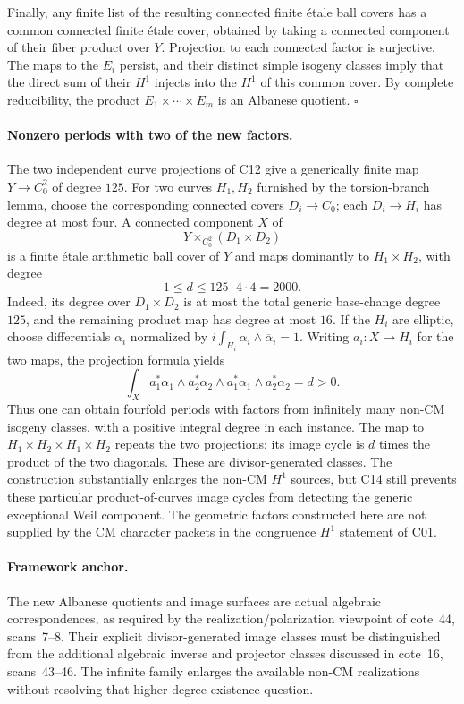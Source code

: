 Finally, any finite list of the resulting connected finite \'{e}tale
ball covers has a common connected finite \'{e}tale cover, obtained by
taking a connected component of their fiber product over $Y$.  Projection
to each connected factor is surjective.  The maps to the $E_i$ persist,
and their distinct simple isogeny classes imply that the direct sum of
their $H^1$ injects into the $H^1$ of this common cover.  By complete
reducibility, the product $E_1\times\cdots\times E_m$ is an Albanese
quotient. \hfill$\square$

\paragraph{Nonzero periods with two of the new factors.}
The two independent curve projections of C12 give a generically finite
map $Y\to C_0^2$ of degree $125$.  For two curves $H_1,H_2$ furnished by
the torsion-branch lemma, choose the corresponding connected covers
$D_i\to C_0$; each $D_i\to H_i$ has degree at most four.  A connected
component $X$ of
\[
 Y\times_{C_0^2}(D_1\times D_2)
\]
is a finite \'{e}tale arithmetic ball cover of $Y$ and maps dominantly to
$H_1\times H_2$, with degree
\[
 1\leq d\leq125\cdot4\cdot4=2000.
\]
Indeed, its degree over $D_1\times D_2$ is at most the total generic
base-change degree $125$, and the remaining product map has degree at
most $16$.  If the $H_i$ are elliptic, choose differentials $\alpha_i$
normalized by $i\int_{H_i}\alpha_i\wedge\overline\alpha_i=1$.
Writing $a_i:X\to H_i$ for the two maps, the projection formula yields
\[
 \int_X a_1^*\alpha_1\wedge a_2^*\alpha_2
       \wedge\overline{a_1^*\alpha_1}
       \wedge\overline{a_2^*\alpha_2}=d>0.
\]
Thus one can obtain fourfold periods with factors from infinitely many
non-CM isogeny classes, with a positive integral degree in each instance.
The map to $H_1\times H_2\times H_1\times H_2$ repeats the two
projections; its image cycle is $d$ times the product of the two diagonals.
These are divisor-generated classes.  The construction substantially
enlarges the non-CM $H^1$ sources, but C14 still prevents these particular
product-of-curves image cycles from detecting the generic exceptional
Weil component.  The geometric factors constructed here are not supplied
by the CM character packets in the congruence $H^1$ statement of C01.

\paragraph{Framework anchor.}
The new Albanese quotients and image surfaces are actual algebraic
correspondences, as required by the realization/polarization viewpoint
of cote~44, scans~7--8.  Their explicit divisor-generated image classes
must be distinguished from the additional algebraic inverse and projector
classes discussed in cote~16, scans~43--46.  The infinite family enlarges
the available non-CM realizations without resolving that higher-degree
existence question.
